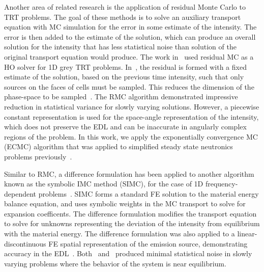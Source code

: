 Another area of related research is the application of
residual Monte Carlo to TRT problems.  The goal of these methods is to solve an auxiliary transport
equation with MC simulation for the error in some estimate of the intensity.  The error is then added to the
estimate of the solution, which can produce an overall solution for the intensity that has
less statistical noise than solution of the original transport equation would produce.
The work in~\cite{rmc} used residual MC as a HO solver for 1D grey TRT problems.
In~\cite{rmc}, the residual is formed with a fixed estimate of the solution, based
on the previous time intensity, such that only
sources on the faces of cells must be sampled. This reduces the dimension of the
phase-space to be sampled~\cite{rmc}. The RMC algorithm demonstrated impressive reduction
in statistical variance for slowly varying solutions.  However, a
piecewise constant representation is used for the space-angle representation of the
intensity, which does not preserve the EDL and can be inaccurate in angularly complex
regions of the problem.  In this work, we apply the exponentially convergence MC (ECMC)
algorithm that was applied to
simplified steady state neutronics problems previously~\cite{jake}.

Similar to RMC, a difference formulation has been applied to another algorithm known as the symbolic IMC method
(SIMC), for the case of 1D frequency-dependent problems~\cite{simc_const}.  SIMC forms a
standard FE solution to the material energy balance equation, and uses symbolic
weights in the MC transport to solve for expansion coefficents.  The difference
formulation modifies the transport equation to solve for unknowns representing the
deviation of the intensity from
equilibrium with the material energy.  The difference
formulation was also applied to a linear-discontinuous FE spatial
representation of the emission source, demonstrating accuracy in the EDL~\cite{simc}. 
Both~\cite{simc_const} and~\cite{rmc} produced minimal
statistical noise in slowly varying problems where the behavior of the system is near
equilibrium. 



